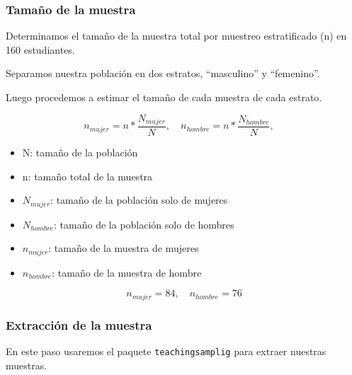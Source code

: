 \documentclass[
]{article}
\begin{document}
\subsubsection*{Tamaño de la muestra}\label{tamauxf1o-de-la-muestra}

Determinamos el tamaño de la muestra total por muestreo estratificado
(n) en 160 estudiantes.

Separamos nuestra población en dos estratos, ``masculino'' y
``femenino''.

Luego procedemos a estimar el tamaño de cada muestra de cada estrato.

\[n_{mujer}= n*\frac{N_{mujer}}{N}, \quad n_{hombre}= n*\frac{N_{hombre}}{N}, \quad \]

\begin{itemize}
    \item N: tamaño de la población 
    \item n: tamaño total de la muestra
    \item $N_{mujer}$: tamaño de la población solo de mujeres
    \item $N_{hombre}$: tamaño de la población solo de hombres
    \item $n_{mujer}$: tamaño de la muestra de mujeres
    \item $n_{hombre}$: tamaño de la muestra de hombre

\end{itemize}

\[n_{mujer}=84, \quad n_{hombre}=76 \]

\subsubsection*{Extracción de la
muestra}\label{extracciuxf3n-de-la-muestra}

En este paso usaremos el paquete \texttt{teachingsamplig} para extraer
nuestras muestras.
\end{document}
